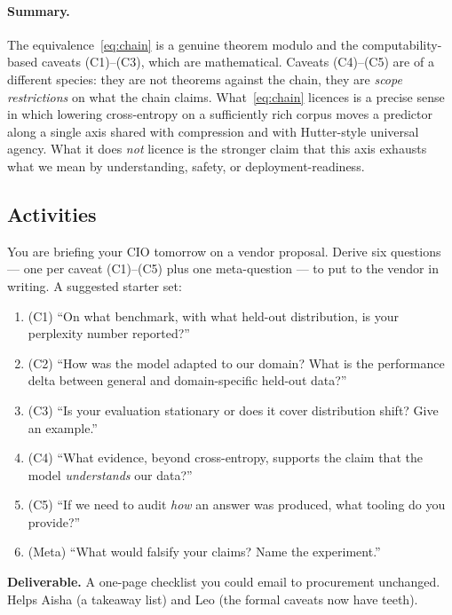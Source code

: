 \documentclass[12pt,a4paper]{article}
\theoremstyle{plain}
\theoremstyle{definition}
\begin{document}
\paragraph{Summary.}
The equivalence~\eqref{eq:chain} is a genuine theorem modulo
 and the computability-based
caveats (C1)--(C3), which are mathematical. Caveats (C4)--(C5) are
of a different species: they are not theorems against the chain,
they are \emph{scope restrictions} on what the chain claims.
What~\eqref{eq:chain} licences is a precise sense in which lowering
cross-entropy on a sufficiently rich corpus moves a predictor along
a single axis shared with compression and with Hutter-style
universal agency. What it does \emph{not} licence is the stronger
claim that this axis exhausts what we mean by understanding, safety,
or deployment-readiness.

\subsection*{Activities}
\label{sec:caveats-activities}

\begin{activity}[title={Activity 8.1 --- Procurement checklist}]
You are briefing your CIO tomorrow on a vendor proposal. Derive six
questions --- one per caveat (C1)--(C5) plus one meta-question ---
to put to the vendor in writing. A suggested starter set:

\begin{enumerate}[leftmargin=1.4em,itemsep=2pt]
  \item (C1) ``On what benchmark, with what held-out distribution, is
        your perplexity number reported?''
  \item (C2) ``How was the model adapted to our domain? What is the
        performance delta between general and domain-specific
        held-out data?''
  \item (C3) ``Is your evaluation stationary or does it cover
        distribution shift? Give an example.''
  \item (C4) ``What evidence, beyond cross-entropy, supports the
        claim that the model \emph{understands} our data?''
  \item (C5) ``If we need to audit \emph{how} an answer was produced,
        what tooling do you provide?''
  \item (Meta) ``What would falsify your claims? Name the
        experiment.''
\end{enumerate}

\textbf{Deliverable.} A one-page checklist you could email to
procurement unchanged. Helps Aisha (a takeaway list) and Leo (the
formal caveats now have teeth).
\end{activity}
\end{document}
